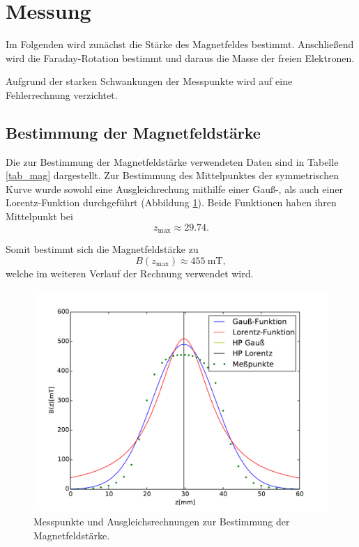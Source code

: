 
\section{Messung} %
\label{sec:messung}
\FloatBarrier
Im Folgenden wird zunächst die Stärke des Magnetfeldes bestimmt. 
Anschließend wird die Faraday-Rotation bestimmt und daraus die Masse der freien Elektronen.

Aufgrund der starken Schwankungen der Messpunkte wird auf eine Fehlerrechnung verzichtet.

\subsection{Bestimmung der Magnetfeldstärke} %
\label{sub:bestimmung_der_magnetfeldstärke}

Die zur Bestimmung der Magnetfeldstärke verwendeten Daten sind in Tabelle \ref{tab_mag} dargestellt.
Zur Bestimmung des Mittelpunktes der symmetrischen Kurve wurde sowohl eine Ausgleichrechung mithilfe einer Gauß-, als auch einer Lorentz-Funktion durchgeführt (Abbildung \ref{fig_mag}).
Beide Funktionen haben ihren Mittelpunkt bei
\begin{equation*}
	z_\text{max} \approx 29.74.
\end{equation*}

Somit bestimmt sich die Magnetfeldstärke zu
\begin{equation*}
	B(z_\text{max}) \approx \SI{455}{\milli\tesla},
\end{equation*}
welche im weiteren Verlauf der Rechnung verwendet wird.

\begin{figure}
	\centering
	\includegraphics[width = 14cm]{data/gauss.pdf}
	\caption{Messpunkte und Ausgleichsrechnungen zur Bestimmung der Magnetfeldstärke.}
	\label{fig_mag}
\end{figure}

